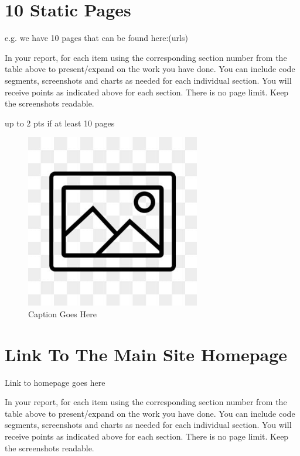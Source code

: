 \documentclass[12pt, letterpaper]{article}
\begin{document}
 \newpage

\section{10 Static Pages}
e.g. we have 10 pages that can be found here:(urls)

In your report, for each item using the corresponding section number from the table above to present/expand on the work you have done. You can include code segments, screenshots and charts as needed for each individual section. You will receive points as indicated above for each section. There is no page limit. Keep the screenshots readable.

up to 2 pts if at least 10 pages 

\begin{figure}[htbp]
	\centering
	\includegraphics[width=3in]{images/placeholder.jpg}
	\caption{Caption Goes Here}
 \end{figure}

 \newpage

\section{Link To The Main Site Homepage}
Link to homepage goes here

In your report, for each item using the corresponding section number from the table above to present/expand on the work you have done. You can include code segments, screenshots and charts as needed for each individual section. You will receive points as indicated above for each section. There is no page limit. Keep the screenshots readable.
\end{document}
